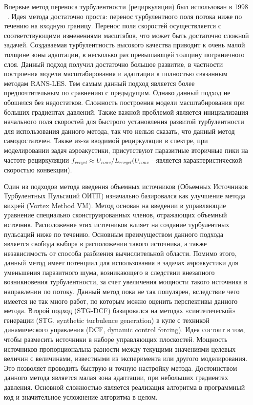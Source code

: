 Впервые метод переноса турбулентности (рециркуляции) был использован в 1998 ~\cite{lund1998generation}. Идея метода достаточно проста: перенос турбулентного поля потока ниже по течению на входную границу. Перенос поля скоростей осуществляется с соответствующими изменениями масштабов, что может быть достаточно сложной задачей. Создаваемая турбулентность высокого качества приводит к очень малой толщине зоны адаптации, в несколько раз превышающей толщину пограничного слоя. Данный подход получил достаточно большое развитие, в частности построения модели масштабирования и адаптации к полностью связанным методам RANS-LES\cite{araya2011dynamic, shur2011rapid, spalart2006direct}. Тем самым данный подход является более предпочтительным по сравнению с предыдущим. Однако данный подход не обошелся без недостатков. Сложность построения модели масштабирования при больших градиентах давлений. Также важной проблемой является инициализация начального поля скоростей для быстрого установления развитой турбулентности для использования данного метода, так что нельзя сказать, что данный метод самодостаточен. Также из-за вводимой рециркуляции в спектре, при моделировании задач аэроакустики, присутствуют паразитные вторичные пики на частоте рециркуляции $f_{recycl} \approx U_{conv} / L_{recycl} (U_{conv}$ - является характеристической скоростью конвекции). 

Один из подходов метода введения объемных источников (Объемных Источников Турбулентных Пульсаций ОИТП) изначально базировался как улучшение метода вихрей (Vortex Method VM)\cite{gritskevich2012embedded}. Метод основан на введении в управляющие уравнение специально сконструированных членов, отражающих объемный источник. Расположение этих источников влияет на создание турбулентных пульсаций ниже по течению. Основным преимуществом данного подхода является свобода выбора в расположении такого источника, а также независимость от способа разбиения вычислительной области. Помимо этого, данный метод имеет потенциал для использования в задачах аэроакустики для уменьшения паразитного шума, возникающего в следствии внезапного возникновения турбулентности, за счет увеличения мощности такого источника в направлении по потоку. Данный метод пока не так популярен, вследствие чего имеется не так много работ, по которым можно оценить перспективы данного метода. Второй подход (STG-DCF) базировался на методах «синтетической» генерации (STG, synthetic turbulence generation) в купе с техникой динамического управления (DCF, dynamic control forcing)\cite{spille2001generation}. Идея состоит в том, чтобы размесить источники в наборе управляющих плоскостей. Мощность источников пропорциональна разности между текущими значениями целевых величин с величинами, известными из эксперимента или другого моделирования. Это позволяет проводить быструю и точную настройку метода. Достоинством данного метода является малая зона адаптации, при небольших градиентах давления. Основной сложностью является реализация алгоритма в программный код и значительное усложнение алгоритма в целом. 

